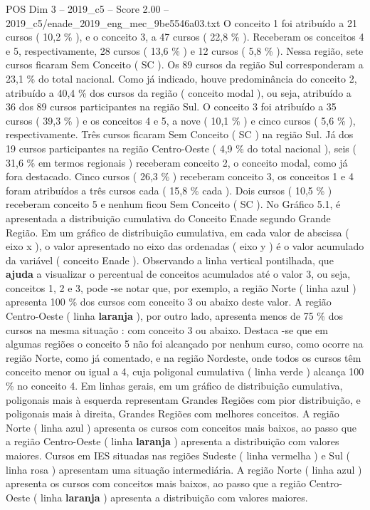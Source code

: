 \begin{textsample}{POS Dim 3 – 2019\_c5 – Score 2.00 – 2019\_c5/enade\_2019\_eng\_mec\_9be5546a03.txt}
O conceito 1 foi atribuído a 21 cursos ( 10,2 \% ), e o conceito 3, a 47 cursos ( 22,8 \% ).
Receberam os conceitos 4 e 5, respectivamente, 28 cursos ( 13,6 \% ) e 12 cursos ( 5,8 \% ).
Nessa região, sete cursos ficaram Sem Conceito ( SC ).
Os 89 cursos da região Sul corresponderam a 23,1 \% do total nacional.
Como já indicado, houve predominância do conceito 2, atribuído a 40,4 \% dos cursos da região ( conceito modal ), ou seja, atribuído a 36 dos 89 cursos participantes na região Sul.
O conceito 3 foi atribuído a 35 cursos ( 39,3 \% ) e os conceitos 4 e 5, a nove ( 10,1 \% ) e cinco cursos ( 5,6 \% ), respectivamente.
Três cursos ficaram Sem Conceito ( SC ) na região Sul.
Já dos 19 cursos participantes na região Centro-Oeste ( 4,9 \% do total nacional ), seis ( 31,6 \% em termos regionais ) receberam conceito 2, o conceito modal, como já fora destacado.
Cinco cursos ( 26,3 \% ) receberam conceito 3, os conceitos 1 e 4 foram atribuídos a três cursos cada ( 15,8 \% cada ).
Dois cursos ( 10,5 \% ) receberam conceito 5 e nenhum ficou Sem Conceito ( SC ).
No Gráfico 5.1, é apresentada a distribuição cumulativa do Conceito Enade segundo Grande Região.
Em um gráfico de distribuição cumulativa, em cada valor de abscissa ( eixo x ), o valor apresentado no eixo das ordenadas ( eixo y ) é o valor acumulado da variável ( conceito Enade ).
Observando a linha vertical pontilhada, que \textbf{ajuda} a visualizar o percentual de conceitos acumulados até o valor 3, ou seja, conceitos 1, 2 e 3, pode -se notar que, por exemplo, a região Norte ( linha azul ) apresenta 100 \% dos cursos com conceito 3 ou abaixo deste valor.
A região Centro-Oeste ( linha \textbf{laranja} ), por outro lado, apresenta menos de 75 \% dos cursos na mesma situação : com conceito 3 ou abaixo.
Destaca -se que em algumas regiões o conceito 5 não foi alcançado por nenhum curso, como ocorre na região Norte, como já comentado, e na região Nordeste, onde todos os cursos têm conceito menor ou igual a 4, cuja poligonal cumulativa ( linha verde ) alcança 100 \% no conceito 4.
Em linhas gerais, em um gráfico de distribuição cumulativa, poligonais mais à esquerda representam Grandes Regiões com pior distribuição, e poligonais mais à direita, Grandes Regiões com melhores conceitos.
A região Norte ( linha azul ) apresenta os cursos com conceitos mais baixos, ao passo que a região Centro-Oeste ( linha \textbf{laranja} ) apresenta a distribuição com valores maiores.
Cursos em IES situadas nas regiões Sudeste ( linha vermelha ) e Sul ( linha rosa ) apresentam uma situação intermediária.
A região Norte ( linha azul ) apresenta os cursos com conceitos mais baixos, ao passo que a região Centro-Oeste ( linha \textbf{laranja} ) apresenta a distribuição com valores maiores.

\end{textsample}
